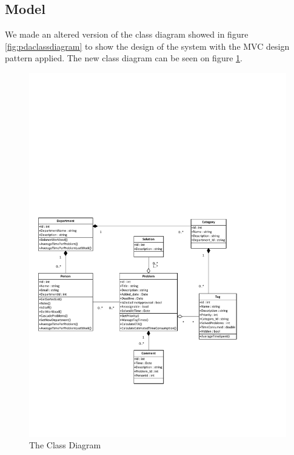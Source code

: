 \subsection{Model}
\label{sub:modelComponent}
We made an altered version of the class diagram showed in figure \ref{fig:pdaclassdiagram} to show the design of the system with the MVC design pattern applied. The new class diagram can be seen on figure \ref{fig:ClassDiagramV2}.

\begin{figure}%
\includegraphics[scale=0.75]{input/component_design/ClassDiagramV2.pdf}%
\caption{The Class Diagram}%
\label{fig:ClassDiagramV2}%
\end{figure}

